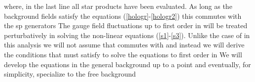 \documentclass[a4paper,12pt]{article}
\begin{document}
where, in the last line all star products have been evaluated. As long as
the background fields satisfy the equations (\ref{hologr}-\ref{hologr2})
this \coordHE{} commutes with the sp\coordHE{}
generators \coordHE{} The gauge field fluctuations \coordHE{} up to first order in \coordHE{} will be treated perturbatively
in solving the non-linear equations (\ref{s1}-\ref{s3}). Unlike the case of \coordHE{} in this analysis we will not assume that \coordHE{} commutes with \coordHE{} and instead we will derive
the conditions that \coordHE{} must satisfy to solve the
equations to first order in \coordHE{} We will develop the equations in the
general background \coordHE{} up to a point and
eventually, for simplicity, specialize to the free background \coordHE{}
\end{document}
